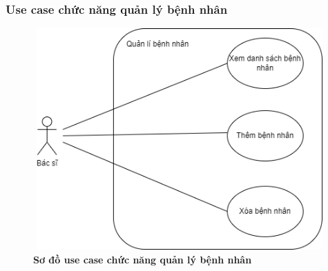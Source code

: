 \subsubsection{Use case chức năng quản lý bệnh nhân}
  \begin{figure}[H]
    \centering
    \includegraphics[width=14.2cm,height=8.5cm]{Images/use_case/use_case_manage_patients.png}
    \caption[Sơ đồ use case chức năng quản lý bệnh nhân]{\bfseries \fontsize{12pt}{0pt}
    \selectfont Sơ đồ use case chức năng quản lý bệnh nhân}
    \label{use_case_patient_management} %
  \end{figure}

